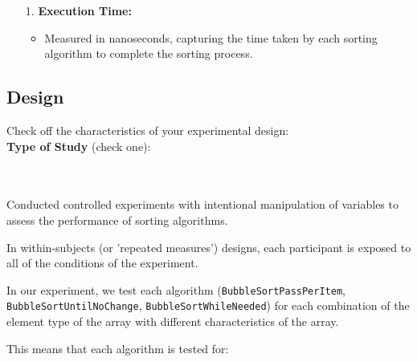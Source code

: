 \documentclass{article}
\begin{document}
\begin{tcolorbox}[title=Dependent Variable:, colback=white, colframe=black, arc=0pt, outer arc=0pt]
    \begin{itemize}
        \item[1.] \textbf{Execution Time:}
        \begin{itemize}
            \item Measured in nanoseconds, capturing the time taken by each sorting algorithm to complete the sorting process.
        \end{itemize}
    \end{itemize}
\end{tcolorbox}

\subsection{Design}
Check off the characteristics of your experimental design:\\

\textbf{Type of Study} (check one):\\
\noindent
\begin{minipage}{0.4\textwidth}
\end{minipage}%
\begin{minipage}{0.4\textwidth}
\end{minipage}%
\begin{minipage}{0.2\textwidth}
\end{minipage}\\\\
Conducted controlled experiments with intentional manipulation of variables to assess the performance of sorting algorithms.

In within-subjects (or 'repeated measures') designs, each participant is exposed to all of the conditions of the experiment.

In our experiment, we test each algorithm (\texttt{BubbleSortPassPerItem}, \texttt{BubbleSortUntilNoChange}, \texttt{BubbleSortWhileNeeded}) for each combination of the element type of the array with different characteristics of the array.

This means that each algorithm is tested for:
\end{document}
